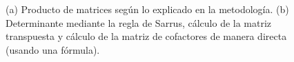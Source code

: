\begin{figure}[H]
\caption{(a) Producto de matrices según lo explicado en la metodología. (b) Determinante mediante la regla de Sarrus, cálculo de la matriz transpuesta y cálculo de la matriz de cofactores de manera directa (usando una fórmula).}
\label{FDp4}
\end{figure}

